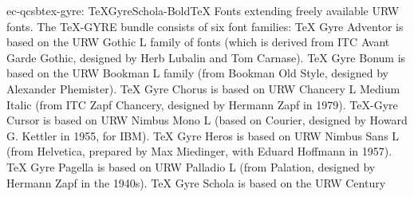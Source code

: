 \documentclass{ddltxtyp}
\begin{document}
\begin{package}{ec-qcsb}{tex-gyre: TeXGyreSchola-Bold}{{\TeX} Fonts extending freely available URW fonts.}
The {\TeX}-GYRE bundle consists of six font families: {\TeX} Gyre
Adventor is based on the URW Gothic L family of fonts (which is
derived from ITC Avant Garde Gothic, designed by Herb Lubalin
and Tom Carnase). {\TeX} Gyre Bonum is based on the URW Bookman L
family (from Bookman Old Style, designed by Alexander
Phemister). {\TeX} Gyre Chorus is based on URW Chancery L Medium
Italic (from ITC Zapf Chancery, designed by Hermann Zapf in
1979). {\TeX}-Gyre Cursor is based on URW Nimbus Mono L (based on
Courier, designed by Howard G. Kettler in 1955, for IBM). {\TeX}
Gyre Heros is based on URW Nimbus Sans L (from Helvetica,
prepared by Max Miedinger, with Eduard Hoffmann in 1957). {\TeX}
Gyre Pagella is based on URW Palladio L (from Palation,
designed by Hermann Zapf in the 1940s). {\TeX} Gyre Schola is
based on the URW Century %
\end{package}
\end{document}
